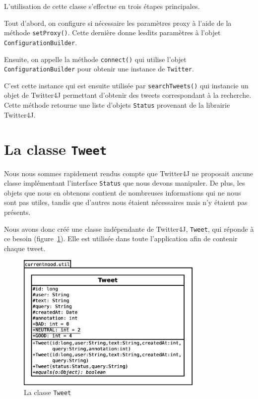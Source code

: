 \documentclass[12pt,a4paper]{report}
\begin{document}
L'utilisation de cette classe s'effectue en trois étapes principales.

Tout d'abord, on configure si nécessaire les paramètres proxy à l'aide de la
méthode \texttt{setProxy()}. Cette dernière donne lesdits paramètres à l'objet
\texttt{ConfigurationBuilder}.

Ensuite, on appelle la méthode \texttt{connect()} qui utilise l'objet
\texttt{ConfigurationBuilder} pour obtenir une instance de \texttt{Twitter}.

C'est cette instance qui est ensuite utilisée par \texttt{searchTweets()} qui
instancie un objet de Twitter4J permettant d'obtenir des tweets correspondant
à la recherche. Cette méthode retourne une liste d'objets \texttt{Status}
provenant de la librairie Twitter4J.

\newpage
\section{La classe \texttt{Tweet}}

Nous nous sommes rapidement rendus compte que Twitter4J ne proposait aucune
classe implémentant l'interface \texttt{Status} que nous devons manipuler. De
plus, les objets que nous en obtenons contient de nombreuses informations qui ne
nous sont pas utiles, tandis que d'autres nous étaient nécessaires mais
n'y étaient pas présents.

Nous avons donc créé une classe indépendante de Twitter4J, \texttt{Tweet}, qui
réponde à ce besoin (figure~\ref{uml_tweet}). Elle est utilisée dans toute l'application afin de contenir
chaque tweet.

\begin{figure}
	\centering
	\includegraphics[width=9cm]{img/uml_tweet.eps}
	\caption{La classe \texttt{Tweet}}
	\label{uml_tweet}
\end{figure}
\end{document}
